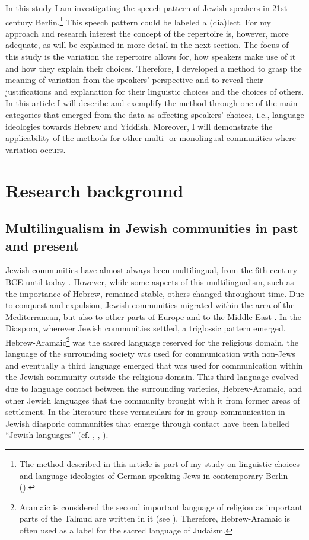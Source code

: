 \documentclass[output=paper]{langscibook}
\begin{document}
In this study I am investigating the speech pattern of Jewish speakers in 21st century Berlin.\footnote{The method described in this article is part of my study on linguistic choices and language ideologies of German-speaking Jews in contemporary Berlin (\citealt{JahnsToAppear}).} This speech pattern could be labeled a (dia)lect. For my approach and research interest the concept of the repertoire is, however, more adequate, as will be explained in more detail in the next section. The focus of this study is the variation the repertoire allows for, how speakers make use of it and how they explain their choices. Therefore, I developed a method to grasp the meaning of variation from the speakers’ perspective and to reveal their justifications and explanation for their linguistic choices and the choices of others. In this article I will describe and exemplify the method through one of the main categories that emerged from the data as affecting speakers’ choices, i.e., language ideologies towards Hebrew and Yiddish. Moreover, I will demonstrate the applicability of the methods for other multi- or monolingual communities where variation occurs.

\section{Research background}
\subsection{Multilingualism in Jewish communities in past and present}

Jewish communities have almost always been multilingual, from the 6th century BCE until today \citep{SpolskyBuninBenor2006}. However, while some aspects of this multilingualism, such as the importance of Hebrew, remained stable, others changed throughout time. Due to conquest and expulsion, Jewish communities migrated within the area of the Mediterranean, but also to other parts of Europe and to the Middle East \citep[136]{Peltz2010}. In the Diaspora, wherever Jewish communities settled, a triglossic pattern emerged. Hebrew-Aramaic\footnote{Aramaic is considered the second important language of religion as important parts of the Talmud are written in it (see \citealt[111]{Myhill2004}). Therefore, Hebrew-Aramaic is often used as a label for the sacred language of Judaism.} was the sacred language reserved for the religious domain, the language of the surrounding society was used for communication with non-Jews and eventually a third language emerged that was used for communication within the Jewish community outside the religious domain. This third language evolved due to language contact between the surrounding varieties, Hebrew-Aramaic, and other Jewish languages that the community brought with it from former areas of settlement. In the literature these vernaculars for in-group communication in Jewish diasporic communities that emerge through contact have been labelled ``Jewish languages'' (cf. \citealt{Peltz2010}, \citealt{Fishman1981}, \citealt{Gold1981}).
\end{document}
